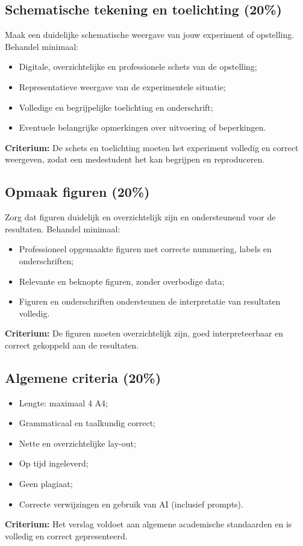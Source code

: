 \documentclass[a4paper,11pt]{article}
\begin{document}
\subsection*{Schematische tekening en toelichting \textbf{(20\%)}}
Maak een duidelijke schematische weergave van jouw experiment of opstelling. Behandel minimaal:
\begin{itemize}[leftmargin=1.5cm, partopsep=1pt, itemsep=2pt, parsep=0pt]
    \item Digitale, overzichtelijke en professionele schets van de opstelling;
    \item Representatieve weergave van de experimentele situatie;
    \item Volledige en begrijpelijke toelichting en onderschrift;
    \item Eventuele belangrijke opmerkingen over uitvoering of beperkingen.
\end{itemize}

\textbf{Criterium:} De schets en toelichting moeten het experiment volledig en correct weergeven, zodat een medestudent het kan begrijpen en reproduceren.

\subsection*{Opmaak figuren \textbf{(20\%)}}
Zorg dat figuren duidelijk en overzichtelijk zijn en ondersteunend voor de resultaten. Behandel minimaal:
\begin{itemize}[leftmargin=1.5cm, partopsep=1pt, itemsep=2pt, parsep=0pt]
    \item Professioneel opgemaakte figuren met correcte nummering, labels en onderschriften;
    \item Relevante en beknopte figuren, zonder overbodige data;
    \item Figuren en onderschriften ondersteunen de interpretatie van resultaten volledig.
\end{itemize}

\textbf{Criterium:} De figuren moeten overzichtelijk zijn, goed interpreteerbaar en correct gekoppeld aan de resultaten.

\subsection*{Algemene criteria \textbf{(20\%)}}
\begin{itemize}[leftmargin=1.5cm, partopsep=1pt, itemsep=2pt, parsep=0pt]
    \item Lengte: maximaal 4 A4;
    \item Grammaticaal en taalkundig correct;
    \item Nette en overzichtelijke lay-out;
    \item Op tijd ingeleverd;
    \item Geen plagiaat;
    \item Correcte verwijzingen en gebruik van AI (inclusief prompts).
\end{itemize}

\textbf{Criterium:} Het verslag voldoet aan algemene academische standaarden en is volledig en correct gepresenteerd.
\end{document}
